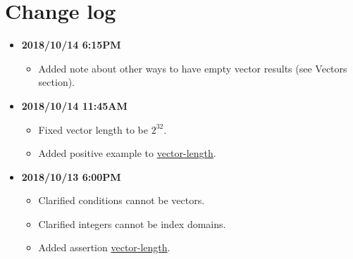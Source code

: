 \documentclass{article}
\newcommand{\assertionref}[1]{\hyperlink{#1}{#1}}
\begin{document}
\section{Change log}
\begin{itemize}
  \item
    \textbf{2018/10/14 6:15PM}
    \begin{itemize}
      \item Added note about other ways to have empty vector results (see Vectors section).
    \end{itemize}
  \item
    \textbf{2018/10/14 11:45AM}
    \begin{itemize}
      \item Fixed vector length to be $2^{32}$.
      \item Added positive example to \assertionref{vector-length}.
    \end{itemize}
  \item
    \textbf{2018/10/13 6:00PM}
    \begin{itemize}
      \item Clarified conditions cannot be vectors.
      \item Clarified integers cannot be index domains.
      \item Added assertion \assertionref{vector-length}.
    \end{itemize}
\end{itemize}
\end{document}

